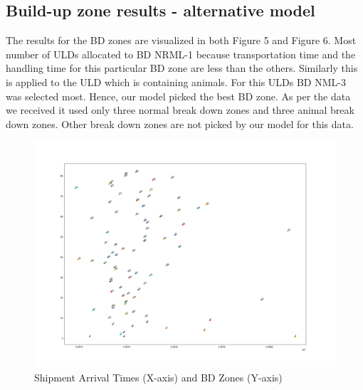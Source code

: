 \documentclass[11pt,a4paper,fleqn]{article}
\begin{document}
\pagebreak
\subsection{Build-up zone results - alternative model}
\label{sec:fmBDResults}
The results for the BD zones are visualized in both Figure 5 and Figure 6. Most number of ULDs allocated to BD NRML-1 because transportation time and the handling time for this particular BD zone are less than the others. Similarly this is applied to the ULD which is containing animals. For this ULDs BD NML-3 was selected most. Hence, our model picked the best BD zone. As per the data we received it used only three normal break down zones and three animal break down zones. Other break down zones are not picked by our model for this data.

\begin{figure}[hbt!]
	\centering
	\includegraphics[width=150mm,scale=1.0]{al_model_2.png}
	\caption{Shipment Arrival Times (X-axis) and BD Zones (Y-axis)}
	\label{fig:Shipment Arrival Times (X-axis) and BD Zones (Y-axis)}
\end{figure}


\end{document}
